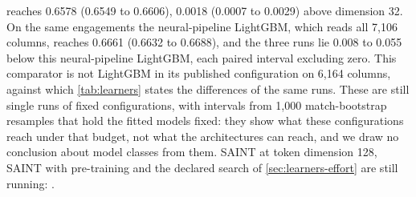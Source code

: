 reaches 0.6578 (0.6549 to 0.6606), 0.0018 (0.0007 to 0.0029) above dimension 32. On the same engagements
the neural-pipeline LightGBM, which reads all 7,106 columns, reaches 0.6661 (0.6632 to 0.6688), and the
three runs lie 0.008 to 0.055 below this neural-pipeline LightGBM, each paired interval excluding zero.
This comparator is not LightGBM in its published configuration on 6,164 columns, against which
\cref{tab:learners} states the differences of the same runs.
These are still single
runs of fixed configurations, with intervals from 1,000 match-bootstrap resamples that hold the fitted
models fixed: they show what these configurations reach under that budget, not what the architectures can
reach, and we draw no conclusion about model classes from them. SAINT at token dimension 128, SAINT with
pre-training and the declared search of \cref{sec:learners-effort} are still running:
.
